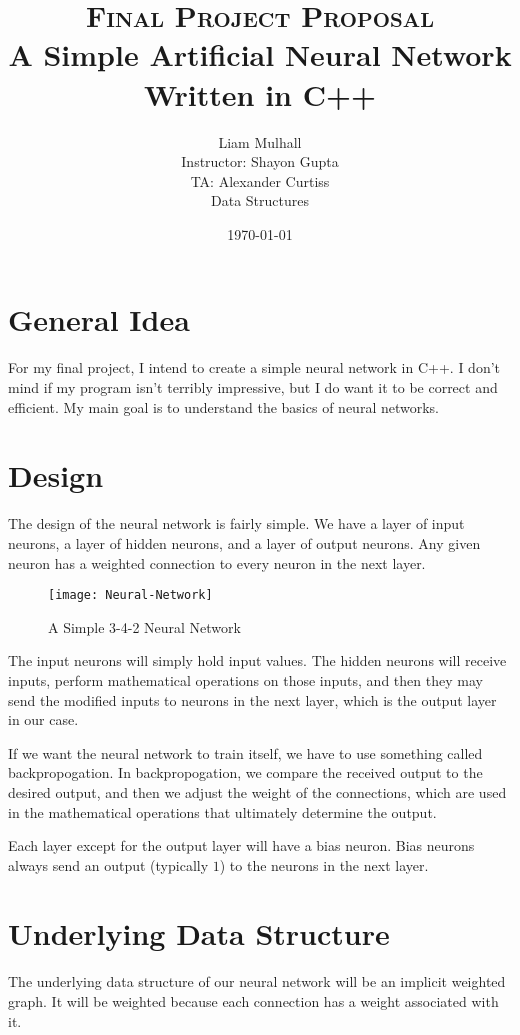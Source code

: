 \documentclass{article}
\title{
\textsc{Final Project Proposal} \\
A Simple Artificial Neural Network Written in C++
}
\author{
Liam Mulhall \\
Instructor: Shayon Gupta \\
TA: Alexander Curtiss \\
Data Structures
}
\date{\today}
\begin{document}
\maketitle

\section{General Idea}

For my final project, I intend to create a simple neural network in C++. I
don't mind if my program isn't terribly impressive, but I do want it to be
correct and efficient. My main goal is to understand the basics of neural
networks.

\section{Design}

The design of the neural network is fairly simple. We have a layer of input
neurons, a layer of hidden neurons, and a layer of output neurons. Any given
neuron has a weighted connection to every neuron in the next layer.

\begin{figure}[h]
  \centering
  \texttt{[image: Neural-Network]}
  \caption{A Simple 3-4-2 Neural Network}
\end{figure}

The input neurons will simply hold input values. The hidden neurons will
receive inputs, perform mathematical operations on those inputs, and then they
may send the modified inputs to neurons in the next layer, which is the output
layer in our case.

If we want the neural network to train itself, we have to use something called
backpropogation. In backpropogation, we compare the received output to the
desired output, and then we adjust the weight of the connections, which are
used in the mathematical operations that ultimately determine the output.

Each layer except for the output layer will have a bias neuron. Bias neurons
always send an output (typically \( 1 \)) to the neurons in the next layer.

\section{Underlying Data Structure}

The underlying data structure of our neural network will be an implicit
weighted graph. It will be weighted because each connection has a weight
associated with it.
\end{document}
